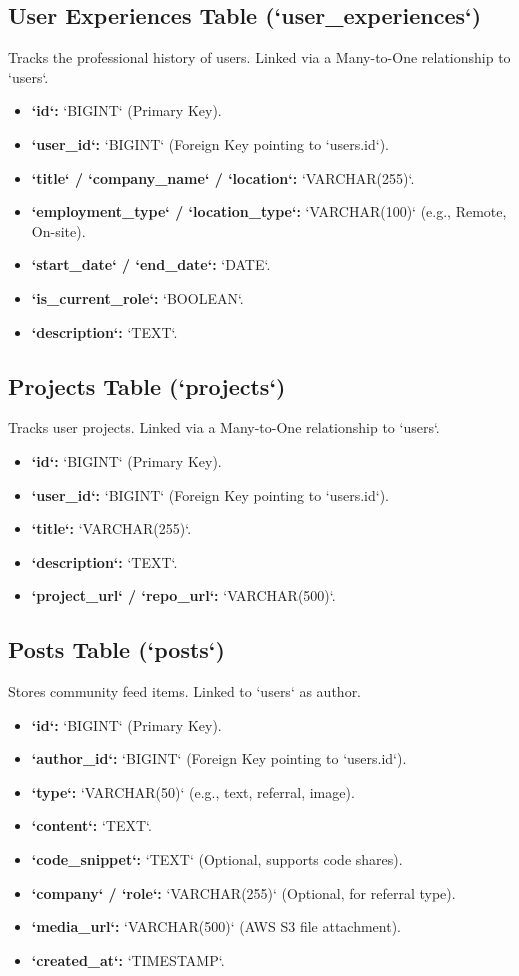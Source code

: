 \subsection{User Experiences Table (`user\_experiences`)}
Tracks the professional history of users. Linked via a Many-to-One relationship to `users`.
\begin{itemize}
    \item \textbf{`id`:} `BIGINT` (Primary Key).
    \item \textbf{`user\_id`:} `BIGINT` (Foreign Key pointing to `users.id`).
    \item \textbf{`title` / `company\_name` / `location`:} `VARCHAR(255)`.
    \item \textbf{`employment\_type` / `location\_type`:} `VARCHAR(100)` (e.g., Remote, On-site).
    \item \textbf{`start\_date` / `end\_date`:} `DATE`.
    \item \textbf{`is\_current\_role`:} `BOOLEAN`.
    \item \textbf{`description`:} `TEXT`.
\end{itemize}

\subsection{Projects Table (`projects`)}
Tracks user projects. Linked via a Many-to-One relationship to `users`.
\begin{itemize}
    \item \textbf{`id`:} `BIGINT` (Primary Key).
    \item \textbf{`user\_id`:} `BIGINT` (Foreign Key pointing to `users.id`).
    \item \textbf{`title`:} `VARCHAR(255)`.
    \item \textbf{`description`:} `TEXT`.
    \item \textbf{`project\_url` / `repo\_url`:} `VARCHAR(500)`.
\end{itemize}

\subsection{Posts Table (`posts`)}
Stores community feed items. Linked to `users` as author.
\begin{itemize}
    \item \textbf{`id`:} `BIGINT` (Primary Key).
    \item \textbf{`author\_id`:} `BIGINT` (Foreign Key pointing to `users.id`).
    \item \textbf{`type`:} `VARCHAR(50)` (e.g., text, referral, image).
    \item \textbf{`content`:} `TEXT`.
    \item \textbf{`code\_snippet`:} `TEXT` (Optional, supports code shares).
    \item \textbf{`company` / `role`:} `VARCHAR(255)` (Optional, for referral type).
    \item \textbf{`media\_url`:} `VARCHAR(500)` (AWS S3 file attachment).
    \item \textbf{`created\_at`:} `TIMESTAMP`.
\end{itemize}

